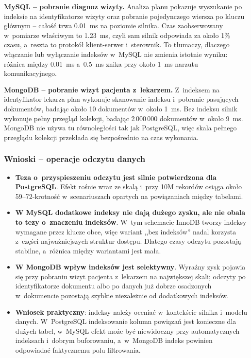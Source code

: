 \documentclass[12pt,a4paper]{article}
\begin{document}
\textbf{MySQL -- pobranie diagnoz wizyty.} Analiza planu pokazuje wyszukanie po indeksie na identyfikatorze wizyty oraz pobranie pojedynczego wiersza po kluczu głównym -- całość trwa 0.01~ms na poziomie silnika. Czas zaobserwowany w~pomiarze właściwym to 1.23~ms, czyli sam silnik odpowiada za około 1\% czasu, a~reszta to protokół klient-serwer i~sterownik. To tłumaczy, dlaczego włączanie lub wyłączanie indeksów w~MySQL nie zmienia istotnie wyniku: różnica między 0.01~ms a~0.5~ms znika przy około 1~ms narzutu komunikacyjnego.

\textbf{MongoDB -- pobranie wizyt pacjenta z~lekarzem.} Z~indeksem na identyfikator lekarza plan wykonuje skanowanie indeksu i~pobranie pasujących dokumentów, badając około 10 dokumentów w~około 1~ms. Bez indeksu silnik wykonuje pełny przegląd kolekcji, badając 2\,000\,000 dokumentów w~około 9~ms. MongoDB nie używa tu równoległości tak jak PostgreSQL, więc skala pełnego przeglądu kolekcji przekłada się bezpośrednio na czas wykonania.

\subsubsection*{Wnioski -- operacje odczytu danych}

\begin{itemize}[noitemsep]
    \item \textbf{Teza o~przyspieszeniu odczytu jest silnie potwierdzona dla PostgreSQL}. Efekt rośnie wraz ze skalą i~przy 10M rekordów osiąga około 59--72-krotność w~scenariuszach opartych na powiązaniach między tabelami.
    \item \textbf{W MySQL dodatkowe indeksy nie dają dużego zysku, ale nie obala to tezy o~znaczeniu indeksów}. W~tym schemacie InnoDB tworzy indeksy wymagane przez klucze obce, więc wariant ,,bez indeksów'' nadal korzysta z~części najważniejszych struktur dostępu. Dlatego czasy odczytu pozostają stabilne, a~różnica między wariantami jest mała.
    \item \textbf{W MongoDB wpływ indeksów jest selektywny}. Wyraźny zysk pojawia się przy pobraniu wizyt pacjenta z~lekarzem na największej skali; odczyty po identyfikatorze dokumentu albo po danych już dobrze osadzonych w~dokumencie pozostają szybkie niezależnie od dodatkowych indeksów.
    \item \textbf{Wniosek praktyczny}: indeksy należy oceniać w~kontekście silnika i~modelu danych. W~PostgreSQL indeksowanie kolumn powiązań jest konieczne dla dużych tabel, w~MySQL efekt może być niewidoczny przy automatycznych indeksach i~dobrym buforowaniu, a~w~MongoDB indeks powinien odpowiadać faktycznemu polu filtrowania.
\end{itemize}
\end{document}
